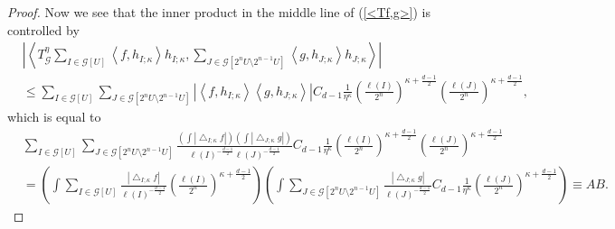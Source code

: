 \documentclass[10pt,a4paper]{amsart}
\begin{document}
\begin{proof}
Now we see that the inner product in the middle line of (\ref{<Tf,g>}) is
controlled by%
\begin{align*}
& \left\vert \left\langle T_{\mathcal{G}}^{\eta}\sum_{I\in\mathcal{G}\left[
U\right]  }\left\langle f,h_{I;\kappa}\right\rangle h_{I;\kappa},\sum
_{J\in\mathcal{G}\left[  2^{n}U\setminus2^{n-1}U\right]  }\left\langle
g,h_{J;\kappa}\right\rangle h_{J;\kappa}\right\rangle \right\vert \\
& \leq\sum_{I\in\mathcal{G}\left[  U\right]  }\sum_{J\in\mathcal{G}\left[
2^{n}U\setminus2^{n-1}U\right]  }\left\vert \left\langle f,h_{I;\kappa
}\right\rangle \left\langle g,h_{J;\kappa}\right\rangle \right\vert
C_{d-1}\frac{1}{\eta^{\kappa}}\left(  \frac{\ell\left(  I\right)  }{2^{n}%
}\right)  ^{\kappa+\frac{d-1}{2}}\left(  \frac{\ell\left(  J\right)  }{2^{n}%
}\right)  ^{\kappa+\frac{d-1}{2}},
\end{align*}
which is equal to%
\begin{align*}
& \sum_{I\in\mathcal{G}\left[  U\right]  }\sum_{J\in\mathcal{G}\left[
2^{n}U\setminus2^{n-1}U\right]  }\frac{\left(  \int\left\vert \bigtriangleup
_{I;\kappa}f\right\vert \right)  \left(  \int\left\vert \bigtriangleup
_{J;\kappa}g\right\vert \right)  }{\ell\left(  I\right)  ^{-\frac{d-1}{2}}%
\ell\left(  J\right)  ^{-\frac{d-1}{2}}}C_{d-1}\frac{1}{\eta^{\kappa}}\left(
\frac{\ell\left(  I\right)  }{2^{n}}\right)  ^{\kappa+\frac{d-1}{2}}\left(
\frac{\ell\left(  J\right)  }{2^{n}}\right)  ^{\kappa+\frac{d-1}{2}}\\
& =\left(  \int\sum_{I\in\mathcal{G}\left[  U\right]  }\frac{\left\vert
\bigtriangleup_{I;\kappa}f\right\vert }{\ell\left(  I\right)  ^{-\frac{d-1}%
{2}}}\left(  \frac{\ell\left(  I\right)  }{2^{n}}\right)  ^{\kappa+\frac
{d-1}{2}}\right)  \left(  \int\sum_{J\in\mathcal{G}\left[  2^{n}%
U\setminus2^{n-1}U\right]  }\frac{\left\vert \bigtriangleup_{J;\kappa
}g\right\vert }{\ell\left(  J\right)  ^{-\frac{d-1}{2}}}C_{d-1}\frac{1}%
{\eta^{\kappa}}\left(  \frac{\ell\left(  J\right)  }{2^{n}}\right)
^{\kappa+\frac{d-1}{2}}\right)  \equiv AB.
\end{align*}



\end{proof}
\end{document}
